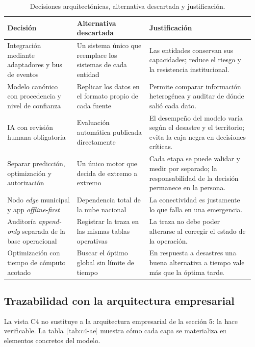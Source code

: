 \documentclass[11pt,a4paper]{article}
\begin{document}
\begin{table}[htbp]
\centering
\caption{Decisiones arquitectónicas, alternativa descartada y justificación.}
\label{tab:adr}
\begin{tabularx}{\textwidth}{@{}p{3.6cm}LL@{}}
\toprule
\textbf{Decisión} & \textbf{Alternativa descartada} & \textbf{Justificación} \\
\midrule
Integración mediante adaptadores y bus de eventos &
Un sistema único que reemplace los sistemas de cada entidad &
Las entidades conservan sus capacidades; reduce el riesgo y la resistencia
institucional. \\
\addlinespace
Modelo canónico con procedencia y nivel de confianza &
Replicar los datos en el formato propio de cada fuente &
Permite comparar información heterogénea y auditar de dónde salió cada dato. \\
\addlinespace
IA con revisión humana obligatoria &
Evaluación automática publicada directamente &
El desempeño del modelo varía según el desastre y el territorio; evita la caja
negra en decisiones críticas. \\
\addlinespace
Separar predicción, optimización y autorización &
Un único motor que decida de extremo a extremo &
Cada etapa se puede validar y medir por separado; la responsabilidad de la
decisión permanece en la persona. \\
\addlinespace
Nodo \emph{edge} municipal y app \emph{offline-first} &
Dependencia total de la nube nacional &
La conectividad es justamente lo que falla en una emergencia. \\
\addlinespace
Auditoría \emph{append-only} separada de la base operacional &
Registrar la traza en las mismas tablas operativas &
La traza no debe poder alterarse al corregir el estado de la operación. \\
\addlinespace
Optimización con tiempo de cómputo acotado &
Buscar el óptimo global sin límite de tiempo &
En respuesta a desastres una buena alternativa a tiempo vale más que la óptima
tarde. \\
\bottomrule
\end{tabularx}
\end{table}

\subsection{Trazabilidad con la arquitectura empresarial}

La vista C4 no sustituye a la arquitectura empresarial de la sección 5: la hace
verificable. La tabla~\ref{tab:c4-ae} muestra cómo cada capa se materializa en
elementos concretos del modelo.
\end{document}
